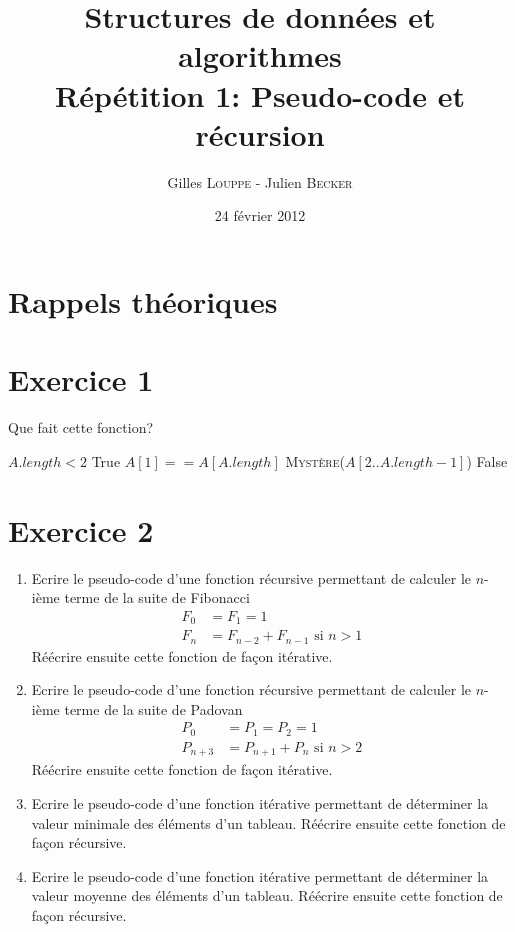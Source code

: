 \documentclass[a4paper,10pt]{article}
\title{
    \textbf{Structures de données et algorithmes}\\
    Répétition 1: Pseudo-code et récursion
}
\author{Gilles \textsc{Louppe} - Julien \textsc{Becker}}
\date{24 février 2012}
\begin{document}
\maketitle

\section*{Rappels théoriques}

\section*{Exercice 1}

Que fait cette fonction?

\begin{codebox}
    \li \If $A.length < 2$
    \li \Then   \Return True
    \li \Else
    \li       \If $A[1] == A[A.length]$
    \li       \Then \Return \textsc{Mystère}($A[2..A.length-1]$)
    \li       \Else
    \li             \Return False
              \End
        \End
    \End
\end{codebox}

\section*{Exercice 2}

\begin{enumerate}
\item Ecrire le pseudo-code d'une fonction récursive permettant de calculer le $n$-ième terme de la suite de Fibonacci
\begin{align*}
F_0 &= F_1 = 1 \\
F_n &= F_{n-2} + F_{n-1} \text{ si } n > 1
\end{align*}
Réécrire ensuite cette fonction de façon itérative.

\item Ecrire le pseudo-code d'une fonction récursive permettant de calculer le $n$-ième terme de la suite de Padovan
\begin{align*}
P_0 &= P_1 = P_2 = 1 \\
P_{n+3} &= P_{n+1} + P_n \text{ si } n > 2
\end{align*}
Réécrire ensuite cette fonction de façon itérative.

\item Ecrire le pseudo-code d'une fonction itérative permettant de déterminer la valeur minimale des éléments d'un tableau. Réécrire ensuite cette fonction de façon récursive.

\item Ecrire le pseudo-code d'une fonction itérative permettant de déterminer la valeur moyenne des éléments d'un tableau. Réécrire ensuite cette fonction de façon récursive.

\end{enumerate}
\end{document}
